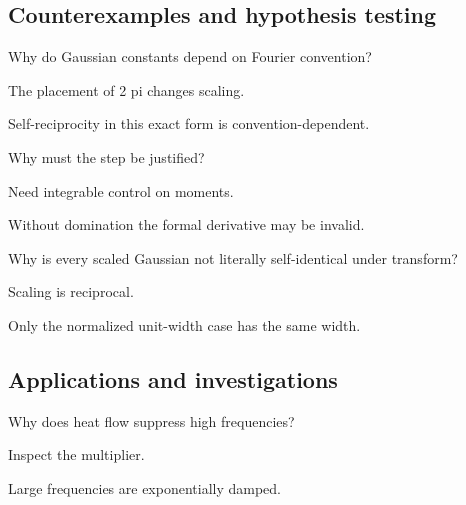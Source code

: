 \subsection*{Counterexamples and hypothesis testing}

\begin{exercise}[Normalization]\label{exr:iii12-expand-10}
Why do Gaussian constants depend on Fourier convention?
\end{exercise}
\begin{hint}
The placement of 2 pi changes scaling.
\end{hint}
\begin{solution}
Self-reciprocity in this exact form is convention-dependent.
\end{solution}

\begin{exercise}\label{exr:iii12-expand-11}
Why must the step be justified?
\end{exercise}
\begin{hint}
Need integrable control on moments.
\end{hint}
\begin{solution}
Without domination the formal derivative may be invalid.
\end{solution}

\begin{exercise}[Width]\label{exr:iii12-expand-12}
Why is every scaled Gaussian not literally self-identical under transform?
\end{exercise}
\begin{hint}
Scaling is reciprocal.
\end{hint}
\begin{solution}
Only the normalized unit-width case has the same width.
\end{solution}

\subsection*{Applications and investigations}

\begin{exercise}\label{exr:iii12-expand-13}
Why does heat flow suppress high frequencies?
\end{exercise}
\begin{hint}
Inspect the multiplier.
\end{hint}
\begin{solution}
Large frequencies are exponentially damped.
\end{solution}

